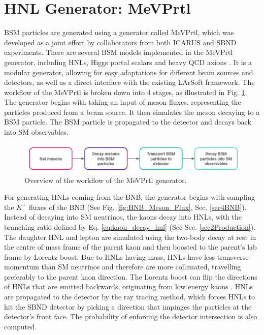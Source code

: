 \section{HNL Generator: MeVPrtl}
\label{sec:gen_mevprtl}

BSM particles are generated using a generator called MeVPrtl, which was developed as a joint effort by collaborators from both ICARUS and SBND experiments.
There are several BSM models implemented in the MeVPrtl generator, including HNLs, Higgs portal scalars \cite{higgs_scalar} and heavy QCD axions \cite{qcd_axion}.
It is a modular generator, allowing for easy adaptations for different beam sources and detectors, as well as a direct interface with the existing LArSoft framework.
The workflow of the MeVPrtl is broken down into 4 stages, as illustrated in Fig. \ref{fig:MeVPrtl_Workflow}.
The generator begins with taking an input of meson fluxes, representing the particles produced from a beam source.
It then simulates the meson decaying to a BSM particle.
The BSM particle is propagated to the detector and decays back into SM observables.

\begin{figure}[htbp!] 
\centering    
\includegraphics[width=1.0\textwidth]{MeVPrtl_Workflow}
\caption[MeVPrtl Generator Workflow]{
Overview of the workflow of the MeVPrtl generator.
}
\label{fig:MeVPrtl_Workflow}
\end{figure}

For generating HNLs coming from the BNB, the generator begins with sampling the $K^{+}$ fluxes of the BNB (See Fig. \ref{fig:BNB_Meson_Flux}, Sec. \ref{sec4BNB}).
Instead of decaying into SM neutrinos, the kaons decay into HNLs, with the branching ratio defined by Eq. \ref{eq:kaon_decay_hnl} (See Sec. \ref{sec2Production}).
The daughter HNL and lepton are simulated using the two-body decay at rest in the centre of mass frame of the parent kaon and then boosted to the parent's lab frame by Lorentz boost.
Due to HNLs having mass, HNLs have less transverse momentum than SM neutrinos and therefore are more collimated, travelling preferably to the parent kaon direction.
The Lorentz boost can flip the directions of HNLs that are emitted backwards, originating from low energy kaons \cite{DavidePhD}.
HNLs are propagated to the detector by the ray tracing method, which forces HNLs to hit the SBND detector by picking a direction that impinges the particles at the detector's front face.  
The probability of enforcing the detector intersection is also computed.

